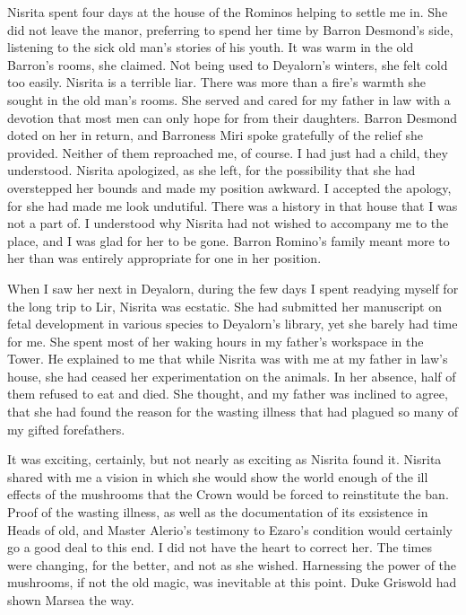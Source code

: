 \documentclass{article}
\begin{document}
Nisrita spent four days at the house of the Rominos helping to settle me in. She did not leave the manor, preferring to spend her time by Barron Desmond's side, listening to the sick old man's stories of his youth. It was warm in the old Barron's rooms, she claimed. Not being used to Deyalorn's winters, she felt cold too easily. Nisrita is a terrible liar. There was more than a fire's warmth she sought in the old man's rooms. She served and cared for my father in law with a devotion that most men can only hope for from their daughters. Barron Desmond doted on her in return, and Barroness Miri spoke gratefully of the relief she provided. Neither of them reproached me, of course. I had just had a child, they understood. Nisrita apologized, as she left, for the possibility that she had overstepped her bounds and made my position awkward. I accepted the apology, for she had made me look undutiful. There was a history in that house that I was not a part of. I understood why Nisrita had not wished to accompany me to the place, and I was glad for her to be gone. Barron Romino's family meant more to her than was entirely appropriate for one in her position. 

When I saw her next in Deyalorn, during the few days I spent readying myself for the long trip to Lir, Nisrita was ecstatic. She had submitted her manuscript on fetal development in various species to Deyalorn's library, yet she barely had time for me. She spent most of her waking hours in my father's workspace in the Tower. He explained to me that while Nisrita was with me at my father in law's house, she had ceased her experimentation on the animals. In her absence, half of them refused to eat and died. She thought, and my father was inclined to agree, that she had found the reason for the wasting illness that had plagued so many of my gifted forefathers.

It was exciting, certainly, but not nearly as exciting as Nisrita found it. Nisrita shared with me a vision in which she would show the world enough of the ill effects of the mushrooms that the Crown would be forced to reinstitute the ban. Proof of the wasting illness, as well as the documentation of its exsistence in Heads of old, and Master Alerio's testimony to Ezaro's condition would certainly go a good deal to this end. I did not have the heart to correct her. The times were changing, for the better, and not as she wished. Harnessing the power of the mushrooms, if not the old magic, was inevitable at this point. Duke Griswold had shown Marsea the way.
\end{document}
